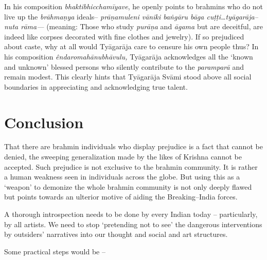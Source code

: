 In his composition \textit{bhakti}\textit{bhicchamīyave}, he openly points to brahmins who do not live up the \textit{brāhmaṇya} ideals– \textit{prāṇamuleni vāniki baṅgāru bāga cuṭṭi…tyāgarāja–nuta rāma—} (meaning: Those who study \textit{purāṇa} and \textit{āgama} but are deceitful, are indeed like corpses decorated with fine clothes and jewelry). If so prejudiced about caste, why at all would Tyāgarāja care to censure his own people thus? In his composition \textit{êndaro}\textit{mahānubhāvulu,} Tyāgarāja acknowledges all the ‘known and unknown’ blessed persons who silently contribute to the \textit{paramparā} and remain modest. This clearly hints that Tyāgarāja Svāmi stood above all social boundaries in appreciating and acknowledging true talent.

\vspace{-.3cm}

\section*{Conclusion}

That there are brahmin individuals who display prejudice is a fact that cannot be denied, the sweeping generalization made by the likes of Krishna cannot be accepted. Such prejudice is not exclusive to the brahmin community. It is rather a human weakness seen in individuals across the globe. But using this as a ‘weapon’ to demonize the whole brahmin community is not only deeply flawed but points towards an ulterior motive of aiding the Breaking–India forces.

A thorough introspection needs to be done by every Indian today – particularly, by all artists. We need to stop ‘pretending not to see’ the dangerous interventions by outsiders’ narratives into our thought and social and art structures.

Some practical steps would be –

